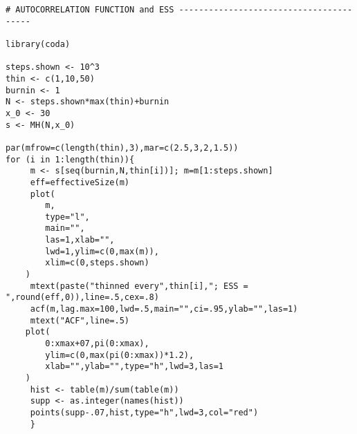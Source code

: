 \begin{appendices}
\begin{verbatim}
# AUTOCORRELATION FUNCTION and ESS ----------------------------------------

library(coda)

steps.shown <- 10^3
thin <- c(1,10,50)
burnin <- 1
N <- steps.shown*max(thin)+burnin
x_0 <- 30
s <- MH(N,x_0)

par(mfrow=c(length(thin),3),mar=c(2.5,3,2,1.5))
for (i in 1:length(thin)){
     m <- s[seq(burnin,N,thin[i])]; m=m[1:steps.shown]
     eff=effectiveSize(m)
     plot(
        m,
        type="l",
        main="",
        las=1,xlab="",
        lwd=1,ylim=c(0,max(m)),
        xlim=c(0,steps.shown)
    )
     mtext(paste("thinned every",thin[i],"; ESS = ",round(eff,0)),line=.5,cex=.8)
     acf(m,lag.max=100,lwd=.5,main="",ci=.95,ylab="",las=1)
     mtext("ACF",line=.5)
    plot(
        0:xmax+07,pi(0:xmax),
        ylim=c(0,max(pi(0:xmax))*1.2),
        xlab="",ylab="",type="h",lwd=3,las=1
    )
     hist <- table(m)/sum(table(m))
     supp <- as.integer(names(hist))
     points(supp-.07,hist,type="h",lwd=3,col="red")
     }


\end{verbatim} 
\end{appendices}
